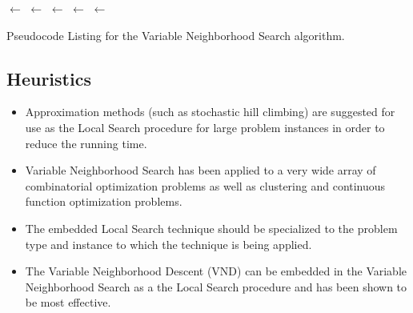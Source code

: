 \begin{algorithm}[Htp]
	\SetLine

	\KwIn{\Neighborhoods}
	\KwOut{\Best}
	\Best $\leftarrow$ \RandomSolution{}\;
	\While{$\neg$ \StopCondition{}} {
		\ForEach{\CurrentNeighborhood $\in$ \Neighborhoods} {
			\Neighborhood $\leftarrow$ \CalculateNeighborhood{\Best, \CurrentNeighborhood}\;
			\Candidate $\leftarrow$ \RandomSolutionInNeighborhood{\Neighborhood}\;
			\Candidate $\leftarrow$ \LocalSearch{\Candidate}\;
			\If{\Cost{\Candidate} $<$ \Cost{\Best}} {
				\Best $\leftarrow$ \Candidate\;
				\Break\;
			}
		}
	}
	\Return{\Best}\;
	\caption{Pseudocode Listing for the Variable Neighborhood Search algorithm.}
	\label{alg:variable_neighborhood_search}
\end{algorithm}

\subsection{Heuristics}
\begin{itemize} 
	\item Approximation methods (such as stochastic hill climbing) are suggested for use as the Local Search procedure for large problem instances in order to reduce the running time.
	\item Variable Neighborhood Search has been applied to a very wide array of combinatorial optimization problems as well as clustering and continuous function optimization problems.
	\item The embedded Local Search technique should be specialized to the problem type and instance to which the technique is being applied. 
	\item The Variable Neighborhood Descent (VND) can be embedded in the Variable Neighborhood Search as a the Local Search procedure and has been shown to be most effective.
\end{itemize}

